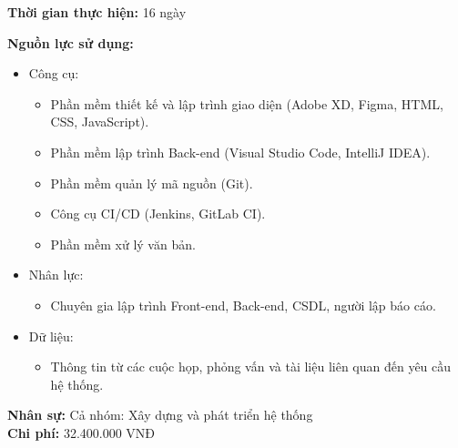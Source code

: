 {\begin{minipage}{\textwidth}
        \noindent\textbf{Thời gian thực hiện:} 16 ngày

        \noindent\textbf{Nguồn lực sử dụng:}
        \begin{itemize}
            \item Công cụ:
                  \begin{itemize}
                      \item Phần mềm thiết kế và lập trình giao diện (Adobe XD, Figma, HTML, CSS, JavaScript).
                      \item Phần mềm lập trình Back-end (Visual Studio Code, IntelliJ IDEA).
                      \item Phần mềm quản lý mã nguồn (Git).
                      \item Công cụ CI/CD (Jenkins, GitLab CI).
                      \item Phần mềm xử lý văn bản.
                  \end{itemize}
            \item Nhân lực:
                  \begin{itemize}
                      \item Chuyên gia lập trình Front-end, Back-end, CSDL, người lập báo cáo.
                  \end{itemize}
            \item Dữ liệu:
                  \begin{itemize}
                      \item Thông tin từ các cuộc họp, phỏng vấn và tài liệu liên quan đến yêu cầu hệ thống.
                  \end{itemize}
        \end{itemize}

        \noindent\textbf{Nhân sự:} Cả nhóm: Xây dựng và phát triển hệ thống \\
        \noindent\textbf{Chi phí:} 32.400.000 VNĐ \\
    \end{minipage}
}
\newpage
